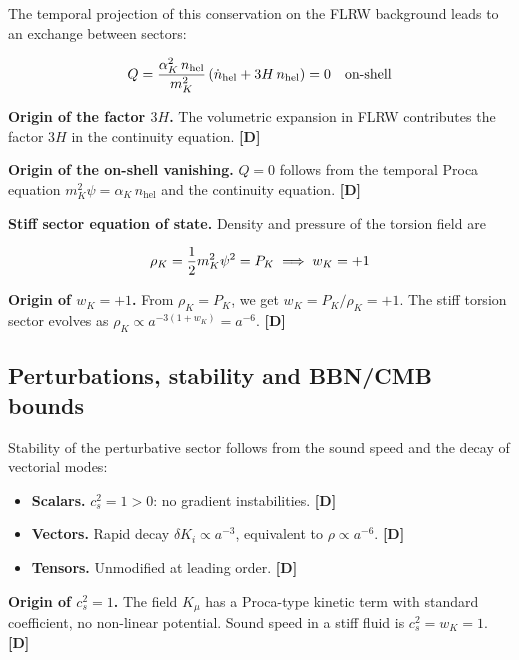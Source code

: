 ﻿\documentclass[11pt,letterpaper]{article}
\begin{document}
The temporal projection of this conservation on the FLRW background leads to an exchange between sectors:

\begin{equation*}
  \resizebox{\ifdim\width>\linewidth \linewidth\else\width\fi}{!}{$\displaystyle Q = \frac{\alpha_K^2\,n_{\text{hel}}}{m_K^2}\left(\dot n_{\text{hel}} + 3H\,n_{\text{hel}}\right) = 0 \quad \text{on-shell}$}
\end{equation*}

\textbf{Origin of the factor $3H$.} The volumetric expansion in FLRW contributes the factor $3H$ in the continuity equation. \textbf{[D]}

\textbf{Origin of the on-shell vanishing.} $Q = 0$ follows from the temporal Proca equation $m_K^2\psi = \alpha_K\,n_{\text{hel}}$ and the continuity equation. \textbf{[D]}

\textbf{Stiff sector equation of state.} Density and pressure of the torsion field are

\begin{equation*}
  \resizebox{\ifdim\width>\linewidth \linewidth\else\width\fi}{!}{$\displaystyle \rho_K = \frac{1}{2}m_K^2\psi^2 = P_K \implies w_K = +1$}
\end{equation*}

\textbf{Origin of $w_K = +1$.} From $\rho_K = P_K$, we get $w_K = P_K/\rho_K = +1$. The stiff torsion sector evolves as $\rho_K \propto a^{-3(1+w_K)} = a^{-6}$. \textbf{[D]}
\subsection{Perturbations, stability and BBN/CMB bounds}
Stability of the perturbative sector follows from the sound speed and the decay of vectorial modes:

\begin{itemize}[leftmargin=*]
\item \textbf{Scalars.} $c_s^2 = 1 > 0$: no gradient instabilities. \textbf{[D]}
\item \textbf{Vectors.} Rapid decay $\delta K_i \propto a^{-3}$, equivalent to $\rho \propto a^{-6}$. \textbf{[D]}
\item \textbf{Tensors.} Unmodified at leading order. \textbf{[D]}
\end{itemize}

\textbf{Origin of $c_s^2 = 1$.} The field $K_\mu$ has a Proca-type kinetic term with standard coefficient, no non-linear potential. Sound speed in a stiff fluid is $c_s^2 = w_K = 1$. \textbf{[D]}
\end{document}
